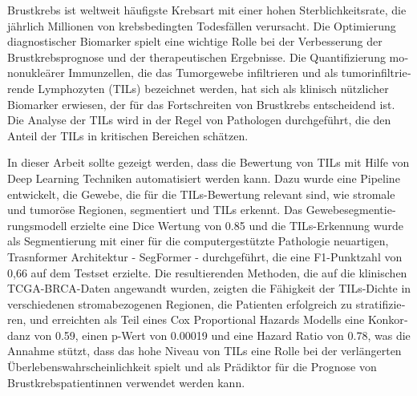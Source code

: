 \begin{otherlanguage}{ngerman} 
Brustkrebs ist weltweit häufigste Krebsart mit einer hohen Sterblichkeitsrate,
die jährlich Millionen von krebsbedingten Todesfällen verursacht.
Die Optimierung diagnostischer Biomarker spielt eine wichtige Rolle bei der
Verbesserung der Brustkrebsprognose und der therapeutischen Ergebnisse.
Die Quantifizierung mononukleärer Immunzellen, die das Tumorgewebe infiltrieren
und als tumorinfiltrierende Lymphozyten (TILs) bezeichnet werden, hat sich als
klinisch nützlicher Biomarker erwiesen, der für das Fortschreiten von Brustkrebs entscheidend ist.
Die Analyse der TILs wird in der Regel von Pathologen durchgeführt, die den Anteil der
TILs in kritischen Bereichen schätzen.

In dieser Arbeit sollte gezeigt werden, dass die Bewertung von TILs mit Hilfe von
Deep Learning Techniken automatisiert werden kann. Dazu wurde eine Pipeline entwickelt,
die Gewebe, die für die TILs-Bewertung relevant sind, wie stromale und tumoröse Regionen,
segmentiert und TILs erkennt. Das Gewebesegmentierungsmodell erzielte eine
Dice Wertung von 0.85 und die TILs-Erkennung wurde als Segmentierung mit einer für die
computergestützte Pathologie neuartigen, Trasnformer Architektur - SegFormer - durchgeführt,
die eine F1-Punktzahl von 0,66 auf dem Testset erzielte. Die resultierenden Methoden,
die auf die klinischen TCGA-BRCA-Daten angewandt wurden, zeigten die Fähigkeit der
TILs-Dichte in verschiedenen stromabezogenen Regionen, die Patienten erfolgreich zu
stratifizieren, und erreichten als Teil eines Cox Proportional Hazards Modells eine
Konkordanz von 0.59, einen p-Wert von 0.00019 und eine Hazard Ratio von 0.78, was die
Annahme stützt, dass das hohe Niveau von TILs eine Rolle bei der verlängerten
Überlebenswahrscheinlichkeit spielt und als Prädiktor für die Prognose von
Brustkrebspatientinnen verwendet werden kann.

\end{otherlanguage}


\makeatletter
{}
{\renewcommand{\abstractname}{Abstract}}
{\renewcommand{\abstractname}{Kurzfassung}}
\makeatother